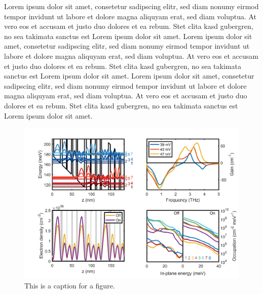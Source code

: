 \documentclass{itqwconf}
\begin{document}
Lorem ipsum dolor sit amet, consetetur sadipscing elitr, sed diam nonumy
eirmod tempor invidunt ut labore et dolore magna aliquyam erat, sed diam
voluptua. At vero eos et accusam et justo duo dolores et ea rebum. Stet clita
kasd gubergren, no sea takimata sanctus est Lorem ipsum dolor sit amet. Lorem
ipsum dolor sit amet, consetetur sadipscing elitr, sed diam nonumy eirmod
tempor invidunt ut labore et dolore magna aliquyam erat, sed diam voluptua.
At vero eos et accusam et justo duo dolores et ea rebum. Stet clita kasd
gubergren, no sea takimata sanctus est Lorem ipsum dolor sit amet. Lorem
ipsum dolor sit amet, consetetur sadipscing elitr, sed diam nonumy eirmod
tempor invidunt ut labore et dolore magna aliquyam erat, sed diam voluptua.
At vero eos et accusam et justo duo dolores et ea rebum. Stet clita kasd
gubergren, no sea takimata sanctus est Lorem ipsum dolor sit amet.

\begin{figure}[h!]
  \centering
  \includegraphics[width=11.96cm]{sample.png}
  \caption{This is a caption for a figure.}
\end{figure}



\end{document}

